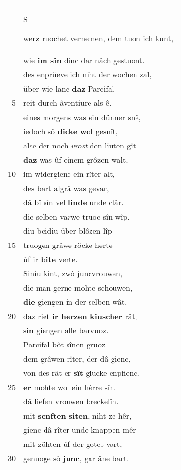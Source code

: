 \documentclass[8pt,a4paper,notitlepage]{article}
\begin{document}
\begin{table}[ht]
\begin{minipage}[t]{0.5\linewidth}
\begin{tabular}{rl}
 & \begin{large}S\end{large}wer\textbf{z} ruochet vernemen, dem tuon ich kunt,\\ 
 & wie \textbf{im sîn} dinc dar nâch gestuont.\\ 
 & des enprüeve ich niht der wochen zal,\\ 
 & über wie lanc \textbf{daz} Parcifal\\ 
5 & reit durch âventiure als ê.\\ 
 & eines morgens was ein dünner snê,\\ 
 & iedoch sô \textbf{dicke} \textbf{wol} gesnît,\\ 
 & alse der noch \textit{vrost} den liuten gît.\\ 
 & \textbf{daz} was ûf einem grôzen walt.\\ 
10 & im widergienc ein rîter alt,\\ 
 & des bart algrâ was gevar,\\ 
 & dâ bî sîn vel \textbf{linde} unde clâr.\\ 
 & die selben va\textit{r}we truoc sîn wîp.\\ 
 & diu beidiu über blôzen lîp\\ 
15 & truogen grâwe röcke herte\\ 
 & ûf ir \textbf{bite} verte.\\ 
 & Sîniu kint, zwô juncvrouwen,\\ 
 & die man gerne mohte schouwen,\\ 
 & \textbf{die} giengen in der selben wât.\\ 
20 & daz riet \textbf{ir} \textbf{herzen kiuscher} rât,\\ 
 & si\textbf{n} giengen alle barvuoz.\\ 
 & Parcifal bôt sînen gruoz\\ 
 & dem grâwen rîter, der dâ gienc,\\ 
 & von des rât er \textbf{sît} glücke enpfienc.\\ 
25 & \textbf{er} mohte wol ein hêrre sîn.\\ 
 & dâ liefen vrouwen breckelîn.\\ 
 & mit \textbf{senften siten}, niht ze hêr,\\ 
 & gienc dâ rîter unde knappen mêr\\ 
 & mit zühten ûf der gotes vart,\\ 
30 & genuoge sô \textbf{junc}, gar âne bart.\\ 
\end{tabular}

\end{minipage}
\end{table}
\end{document}
